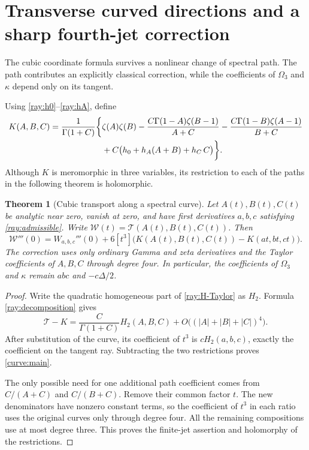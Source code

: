 \documentclass[11pt]{article}
\numberwithin{equation}{section}
\newtheorem{theorem}{Theorem}[section]
\theoremstyle{definition}
\theoremstyle{remark}
\newcommand{\T}{\mathcal T}
\begin{document}

\section{Transverse curved directions and a sharp fourth-jet correction}
\label{sec:curves}

The cubic coordinate formula survives a nonlinear change of spectral
path. The path contributes an explicitly classical correction, while
the coefficients of $\Omega_3$ and $\kappa$ depend only on its tangent.

Using \eqref{ray:h0}--\eqref{ray:hA}, define
\begin{align}
 K(A,B,C)=\frac1{\Gamma(1+C)}\biggl\{
 &\zeta(A)\zeta(B)
 -\frac{C\Gamma(1-A)\zeta(B-1)}{A+C}
 -\frac{C\Gamma(1-B)\zeta(A-1)}{B+C}\notag\\
 &+C\bigl(h_0+h_A(A+B)+h_C\,C\bigr)\biggr\}.
 \label{curve:K}
\end{align}
Although $K$ is meromorphic in three variables, its restriction to
each of the paths in the following theorem is holomorphic.

\begin{theorem}[Cubic transport along a spectral curve]\label{thm:curve}
Let $A(t),B(t),C(t)$ be analytic near zero, vanish at zero, and have
first derivatives $a,b,c$ satisfying \eqref{ray:admissible}.
Write $\mathscr W(t)=\T(A(t),B(t),C(t))$. Then
\begin{equation}\label{curve:main}
 \mathscr W'''(0)=W_{a,b,c}'''(0)+
 6[t^3]\bigl(K(A(t),B(t),C(t))-K(at,bt,ct)\bigr).
\end{equation}
The correction uses only ordinary Gamma and zeta derivatives and
the Taylor coefficients of $A,B,C$ through degree four. In particular,
the coefficients of $\Omega_3$ and $\kappa$ remain $abc$ and
$-c\Delta/2$.
\end{theorem}

\begin{proof}
Write the quadratic homogeneous part of \eqref{ray:H-Taylor} as
$H_2$. Formula \eqref{ray:decomposition} gives
\[
 \T-K=\frac{C}{\Gamma(1+C)}H_2(A,B,C)
            +O\bigl((|A|+|B|+|C|)^4\bigr).
\]
After substitution of the curve, its coefficient of $t^3$ is
$cH_2(a,b,c)$, exactly the coefficient on the tangent ray. Subtracting
the two restrictions proves \eqref{curve:main}.

The only possible need for one additional path coefficient comes
from $C/(A+C)$ and $C/(B+C)$. Remove their common factor $t$.
The new denominators have nonzero constant terms, so the coefficient
of $t^3$ in each ratio uses the original curves only through degree
four. All the remaining compositions use at most degree three.
This proves the finite-jet assertion and holomorphy of the restrictions.
\end{proof}
\end{document}
